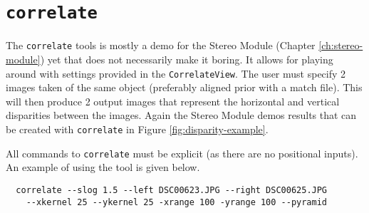 \section{{\tt correlate}}\label{sec:correlate}

The \verb#correlate# tools is mostly a demo for the Stereo Module
(Chapter \ref{ch:stereo-module}) yet that does not necessarily make it
boring. It allows for playing around with settings provided in the
{\tt CorrelateView}. The user must specify 2 images taken of the same
object (preferably aligned prior with a match file). This will then
produce 2 output images that represent the horizontal and vertical
disparities between the images. Again the Stereo Module demos results
that can be created with \verb#correlate# in Figure
\ref{fig:disparity-example}.

All commands to \verb#correlate# must be explicit (as there are no
positional inputs). An example of using the tool is given below.

\begin{verbatim}
  correlate --slog 1.5 --left DSC00623.JPG --right DSC00625.JPG
    --xkernel 25 --ykernel 25 -xrange 100 -yrange 100 --pyramid
\end{verbatim}

